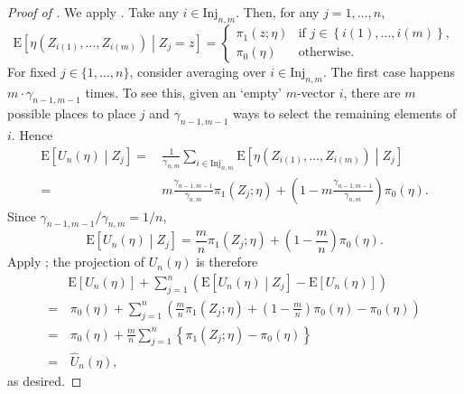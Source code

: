 \documentclass[12pt]{article}
\numberwithin{equation}{section}
\theoremstyle{definition}
\theoremstyle{plain}
\begin{document}
\begin{proof}[Proof of ]
We apply .
Take any \(i \in \mathrm{Inj}_{n, m}\).
Then, for any \(j = 1, \dots, n\),
\begin{equation*}
  \mathrm{E} \left[ \eta \left( Z_{i (1)}, \dots, Z_{i (m)} \right)
  \middle| Z_{j} = z \right] =
  \begin{cases}
    \pi_{1} (z; \eta) & \text{if } j \in
    \left\{ i (1), \dots, i (m) \right\}, \\
    \pi_{0} (\eta) & \text{otherwise}.
  \end{cases}
\end{equation*}
For fixed \(j \in \{1, \dots, n\}\), consider averaging over \(i \in
\mathrm{Inj}_{n, m}\).
The first case happens \(m \cdot \gamma_{n - 1, m - 1}\) times.
To see this, given an `empty' \(m\)-vector \(i\), there are \(m\) possible
places to place \(j\) and \(\gamma_{n - 1, m - 1}\) ways to select the remaining
elements of \(i\).
Hence
\begin{align*}
  \mathrm{E} \left[ U_{n} (\eta) \middle| Z_{j} \right] =
  & \, \frac{1}{\gamma_{n, m}} \sum_{i \in \mathrm{Inj}_{n, m}} \mathrm{E}
  \left[ \eta \left( Z_{i (1)}, \dots, Z_{i (m)} \right) \middle| Z_{j} \right]
  \\
  =
  & \, m \frac{\gamma_{n - 1, m - 1}}{\gamma_{n, m}} \pi_{1} \left( Z_{j}; \eta
  \right) + \left( 1 - m \frac{\gamma_{n - 1, m - 1}}{\gamma_{n, m}} \right)
  \pi_{0} (\eta).
\end{align*}
Since \(\gamma_{n - 1, m - 1} / \gamma_{n, m} = 1 / n\),
\begin{equation*}
  \mathrm{E} \left[ U_{n} (\eta) \middle| Z_{j} \right] = \frac{m}{n}
  \pi_{1} \left( Z_{j}; \eta \right) + \left( 1 - \frac{m}{n} \right) \pi_{0}
  (\eta).
\end{equation*}
Apply ; the projection of \(U_{n} (\eta)\) is
therefore
\begin{align*}
  & \mathrm{E} \left[ U_{n} (\eta) \right] + \sum_{j = 1}^{n}
  \left( \mathrm{E} \left[ U_{n} (\eta) \middle| Z_{j} \right] - \mathrm{E}
  \left[ U_{n} (\eta) \right] \right) \\
  =
  & \, \pi_{0} (\eta) + \sum_{j = 1}^{n} \left( \frac{m}{n}
  \pi_{1} \left( Z_{j}; \eta \right) + \left( 1 - \frac{m}{n}
  \right) \pi_{0} (\eta) - \pi_{0} (\eta) \right) \\
  =
  & \, \pi_{0} (\eta) +  \frac{m}{n} \sum_{j = 1}^{n}
  \left\{ \pi_{1} \left( Z_{j}; \eta \right) - \pi_{0} (\eta)
  \right\} \\
  =
  & \, \widehat{U}_{n} (\eta),
\end{align*}
as desired.
\end{proof}
\end{document}

